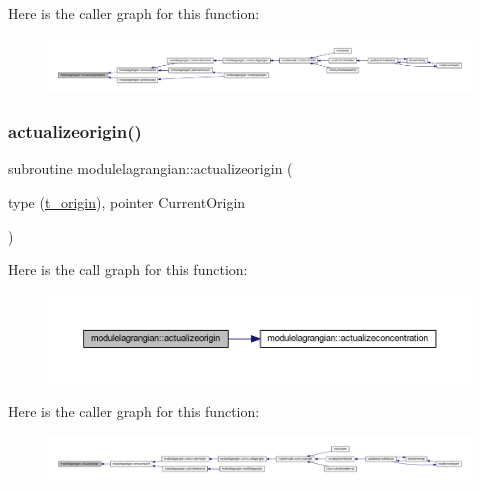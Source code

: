 Here is the caller graph for this function\+:\nopagebreak
\begin{figure}[H]
\begin{center}
\leavevmode
\includegraphics[width=350pt]{namespacemodulelagrangian_a10887a715db0d544ed022e6dc66acdb2_icgraph}
\end{center}
\end{figure}
\mbox{\label{namespacemodulelagrangian_a116b4ab6ebe8a380c1f61f5764053210}} 
\subsubsection{\texorpdfstring{actualizeorigin()}{actualizeorigin()}}
{\footnotesize\ttfamily subroutine modulelagrangian\+::actualizeorigin (\begin{DoxyParamCaption}\item[{type (\mbox{\hyperlink{structmodulelagrangian_1_1t__origin}{t\+\_\+origin}}), pointer}]{Current\+Origin }\end{DoxyParamCaption})\hspace{0.3cm}{\ttfamily [private]}}

Here is the call graph for this function\+:\nopagebreak
\begin{figure}[H]
\begin{center}
\leavevmode
\includegraphics[width=350pt]{namespacemodulelagrangian_a116b4ab6ebe8a380c1f61f5764053210_cgraph}
\end{center}
\end{figure}
Here is the caller graph for this function\+:\nopagebreak
\begin{figure}[H]
\begin{center}
\leavevmode
\includegraphics[width=350pt]{namespacemodulelagrangian_a116b4ab6ebe8a380c1f61f5764053210_icgraph}
\end{center}
\end{figure}
\mbox{\label{namespacemodulelagrangian_ab69c4015dc76dd2209a1eda6139be71f}} 
